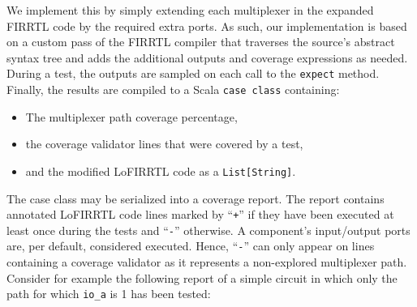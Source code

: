 \documentclass[conference]{IEEEtran}
\begin{document}
We implement this by simply extending each multiplexer in the expanded FIRRTL code by the required extra ports. %
As such, our implementation is based on a custom pass of the FIRRTL compiler that traverses the source's abstract syntax tree and adds the additional outputs and coverage expressions as needed. During a test, the outputs are sampled on each call to the \texttt{expect} method. Finally, the results are compiled to a Scala \texttt{case class} containing:%
\begin{itemize}
\item The multiplexer path coverage percentage,
\item the coverage validator lines that were covered by a test,
\item and the modified LoFIRRTL code as a \texttt{List[String]}.
\end{itemize}
The case class may be serialized into a coverage report. The report contains annotated LoFIRRTL code lines marked by ``\texttt{+}'' if they have been executed at least once during the tests and ``\texttt{-}'' otherwise. A component's input/output ports are, per default, considered executed. Hence, ``\texttt{-}'' can only appear on lines containing a coverage validator as it represents a non-explored multiplexer path. Consider for example the following report of a simple circuit in which only the path for which \texttt{io\_a} is 1 has been tested:
\end{document}
